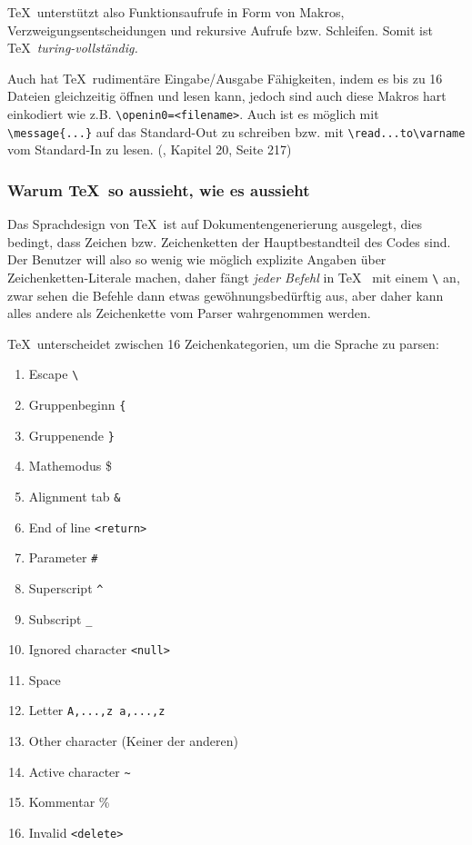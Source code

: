 \TeX~unterstützt also Funktionsaufrufe in Form von Makros,
Verzweigungsentscheidungen
und rekursive Aufrufe bzw. Schleifen. Somit ist \TeX~\emph{turing-vollständig.}

Auch hat \TeX~rudimentäre Eingabe/Ausgabe Fähigkeiten, indem es
bis zu 16 Dateien gleichzeitig öffnen und lesen kann, jedoch sind auch
diese Makros hart einkodiert wie z.B. \lstinline|\openin0=<filename>|.
Auch ist es möglich mit \lstinline|\message{...}| auf das Standard-Out zu schreiben
bzw. mit \lstinline|\read...to\varname| vom Standard-In zu lesen.
(\cite{tex-a}, Kapitel 20, Seite 217)

\subsubsection{Warum \TeX~so aussieht, wie es aussieht}\label{sec-tex-sprachdesign}

Das Sprachdesign von \TeX~ist auf Dokumentengenerierung ausgelegt, dies
bedingt, dass Zeichen bzw. Zeichenketten der Hauptbestandteil des Codes
sind. Der Benutzer will also so wenig wie möglich explizite Angaben über
Zeichenketten-Literale machen, daher fängt \emph{jeder Befehl} in \TeX~
mit einem \lstinline|\| an, zwar sehen die Befehle dann etwas gewöhnungsbedürftig
aus, aber daher kann alles andere als Zeichenkette vom Parser
wahrgenommen werden.

\TeX~unterscheidet zwischen 16 Zeichenkategorien, um die Sprache zu parsen:

\begin{enumerate}
  \item Escape \lstinline|\|
  \item Gruppenbeginn \lstinline|{|
  \item Gruppenende \lstinline|}|
  \item Mathemodus \$
  \item Alignment tab \lstinline|&|
  \item End of line \lstinline|<return>|
  \item Parameter \lstinline|#|
  \item Superscript \lstinline|^|
  \item Subscript \lstinline|_|
  \item Ignored character \lstinline|<null>|
  \item Space
  \item Letter \lstinline|A,...,z a,...,z|
  \item Other character (Keiner der anderen)
  \item Active character \lstinline|~|
  \item Kommentar \%
  \item Invalid \lstinline|<delete>|
\end{enumerate}


